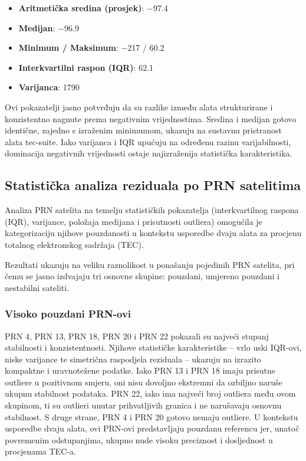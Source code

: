 \documentclass[
]{article}
\providecommand{\tightlist}{%
  \setlength{\itemsep}{0pt}\setlength{\parskip}{0pt}}
\begin{document}
\begin{itemize}
\tightlist
\item
  \textbf{Aritmetička sredina (prosjek)}: −97.4\\
\item
  \textbf{Medijan}: −96.9\\
\item
  \textbf{Minimum / Maksimum}: −217 / 60.2\\
\item
  \textbf{Interkvartilni raspon (IQR)}: 62.1\\
\item
  \textbf{Varijanca}: 1790
\end{itemize}

Ovi pokazatelji jasno potvrđuju da su razlike između alata strukturirane
i konzistentno nagnute prema negativnim vrijednostima. Sredina i medijan
gotovo identične, zajedno s izraženim minimumom, ukazuju na sustavnu
pristranost alata tec-suite. Iako varijanca i IQR upućuju na određenu
razinu varijabilnosti, dominacija negativnih vrijednosti ostaje
najizraženija statistička karakteristika.

\subsection{Statistička analiza reziduala po PRN
satelitima}\label{statistiux10dka-analiza-reziduala-po-prn-satelitima}

Analiza PRN satelita na temelju statističkih pokazatelja
(interkvartilnog raspona (IQR), varijance, položaja medijana i
prisutnosti outliera) omogućila je kategorizaciju njihove pouzdanosti u
kontekstu usporedbe dvaju alata za procjenu totalnog elektronskog
sadržaja (TEC).

Rezultati ukazuju na veliku raznolikost u ponašanju pojedinih PRN
satelita, pri čemu se jasno izdvajaju tri osnovne skupine: pouzdani,
umjereno pouzdani i nestabilni sateliti.

\subsubsection{Visoko pouzdani PRN-ovi}\label{visoko-pouzdani-prn-ovi}

PRN 4, PRN 13, PRN 18, PRN 20 i PRN 22 pokazali su najveći stupanj
stabilnosti i konzistentnosti. Njihove statističke karakteristike --
vrlo uski IQR-ovi, niske varijance te simetrična raspodjela reziduala --
ukazuju na izrazito kompaktne i uravnotežene podatke. Iako PRN 13 i PRN
18 imaju prisutne outliere u pozitivnom smjeru, oni nisu dovoljno
ekstremni da ozbiljno naruše ukupnu stabilnost podataka. PRN 22, iako
ima najveći broj outliera među ovom skupinom, ti su outlieri unutar
prihvatljivih granica i ne narušavaju osnovnu stabilnost. S druge
strane, PRN 4 i PRN 20 gotovo nemaju outliere. U kontekstu usporedbe
dvaju alata, ovi PRN-ovi predstavljaju pouzdanu referencu jer, unatoč
povremenim odstupanjima, ukupno nude visoku preciznost i dosljednost u
procjenama TEC-a.
\end{document}
